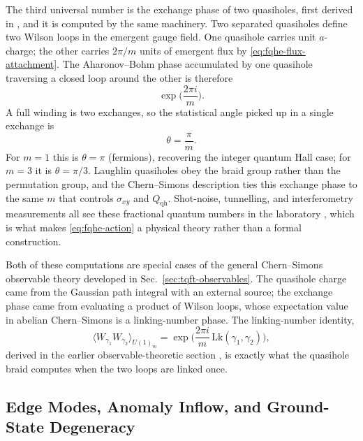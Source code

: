 The third universal number is the exchange phase of two quasiholes, first derived in \cite{ArovasSchriefferWilczek1984FractionalStatistics}, and it is computed by the same machinery. Two separated quasiholes define two Wilson loops in the emergent gauge field. One quasihole carries unit $a$-charge; the other carries $2\pi/m$ units of emergent flux by \eqref{eq:fqhe-flux-attachment}. The Aharonov--Bohm phase accumulated by one quasihole traversing a closed loop around the other is therefore
\begin{equation}
  \exp\!\Big(\frac{2\pi i}{m}\Big).
  \label{eq:fqhe-full-winding}
\end{equation}
A full winding is two exchanges, so the statistical angle picked up in a single exchange is
\begin{equation}
  \theta = \frac{\pi}{m}.
  \label{eq:fqhe-statistical-angle}
\end{equation}
For $m=1$ this is $\theta=\pi$ (fermions), recovering the integer quantum Hall case; for $m=3$ it is $\theta=\pi/3$. Laughlin quasiholes obey the braid group rather than the permutation group, and the Chern--Simons description ties this exchange phase to the same $m$ that controls $\sigma_{xy}$ and $Q_{\mathrm{qh}}$. Shot-noise, tunnelling, and interferometry measurements all see these fractional quantum numbers in the laboratory \cite{Saminadayar1997FractionalCharge,dePicciotto1997FractionalCharge,CaminoZhouGoldman2005ABSuperperiod,Nakamura2020AnyonicBraiding,Bartolomei2020AnyonCollisions}, which is what makes \eqref{eq:fqhe-action} a physical theory rather than a formal construction.

Both of these computations are special cases of the general Chern--Simons observable theory developed in Sec.~\ref{sec:tqft-observables}. The quasihole charge came from the Gaussian path integral with an external source; the exchange phase came from evaluating a product of Wilson loops, whose expectation value in abelian Chern--Simons is a linking-number phase. The linking-number identity,
\begin{equation}
  \bigl\langle W_{\gamma_1}W_{\gamma_2}\bigr\rangle_{U(1)_m}
  =
  \exp\!\Big(\frac{2\pi i}{m}\,\mathrm{Lk}(\gamma_1,\gamma_2)\Big),
\end{equation}
derived in the earlier observable-theoretic section \cite{Witten1989Jones,Dunne1999AspectsCS}, is exactly what the quasihole braid computes when the two loops are linked once.

\subsection{Edge Modes, Anomaly Inflow, and Ground-State Degeneracy}
\label{subsec:edges-degeneracy}

